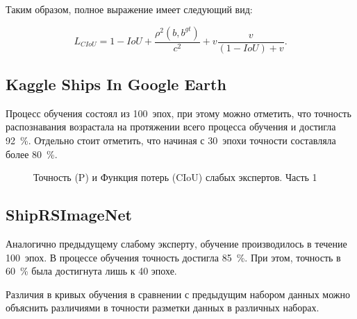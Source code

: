Таким образом, полное выражение имеет следующий вид:

\begin{equation}
    L_{CIoU} = 1 - IoU + \frac{\rho^2(b,b^{gt})}{c^2} + v \frac{v}{(1 - IoU) + v}.
\end{equation}

\subsection*{Kaggle Ships In Google Earth}

Процесс обучения состоял из 100~эпох, при этому можно отметить, что точность распознавания возрастала на протяжении всего процесса обучения и достигла 92~\%. Отдельно стоит отметить, что начиная с 30~эпохи точности составляла более 80~\%.


\begin{figure}[htp]
	\centering
	\captionsetup{justification=centering}
	\caption{Точность (P) и Функция потерь (CIoU) слабых экспертов. Часть 1}
	\label{plt:precision}
\end{figure}

\subsection*{ShipRSImageNet}

Аналогично предыдущему слабому эксперту, обучение производилось в течение 100~эпох. В процессе обучения точность достигла 85~\%. При этом, точность в 60~\% была достигнута лишь к 40 эпохе.

Различия в кривых обучения в сравнении с предыдущим набором данных можно объяснить различиями в точности разметки данных в различных наборах.


